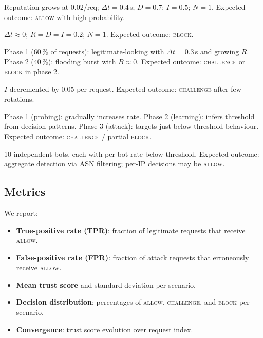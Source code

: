 \documentclass[10pt,conference]{IEEEtran}
\begin{document}
\begin{description}[leftmargin=2em]
  \item[\textbf{Legitimate user}]  Reputation grows at 0.02/req;
    $\Delta t = 0.4$\,s; $D = 0.7$; $I = 0.5$; $N = 1$.
    Expected outcome: \textsc{allow} with high probability.

  \item[\textbf{Fast attacker (hammering)}]  $\Delta t \approx 0$;
    $R = D = I = 0.2$; $N = 1$.
    Expected outcome: \textsc{block}.

  \item[\textbf{Slow warmup}]  Phase 1 (60\,\% of requests):
    legitimate-looking with $\Delta t = 0.3$\,s and growing $R$.
    Phase 2 (40\,\%): flooding burst with $B \approx 0$.
    Expected outcome: \textsc{challenge} or \textsc{block} in phase 2.

  \item[\textbf{Key rotation}]  $I$ decremented by 0.05 per request.
    Expected outcome: \textsc{challenge} after few rotations.

  \item[\textbf{Adaptive attacker}]  Phase 1 (probing): gradually
    increases rate.  Phase 2 (learning): infers threshold from
    decision patterns.  Phase 3 (attack): targets just-below-threshold
    behaviour.  Expected outcome: \textsc{challenge} / partial \textsc{block}.

  \item[\textbf{Distributed low-and-slow}]  10 independent bots,
    each with per-bot rate below threshold.  Expected outcome:
    aggregate detection via ASN filtering; per-IP decisions may be
    \textsc{allow}.
\end{description}

\subsection{Metrics}

We report:
\begin{itemize}[leftmargin=*]
  \item \textbf{True-positive rate (TPR)}: fraction of legitimate
    requests that receive \textsc{allow}.
  \item \textbf{False-positive rate (FPR)}: fraction of attack
    requests that erroneously receive \textsc{allow}.
  \item \textbf{Mean trust score} and standard deviation per scenario.
  \item \textbf{Decision distribution}: percentages of \textsc{allow},
    \textsc{challenge}, and \textsc{block} per scenario.
  \item \textbf{Convergence}: trust score evolution over request index.
\end{itemize}
\end{document}
